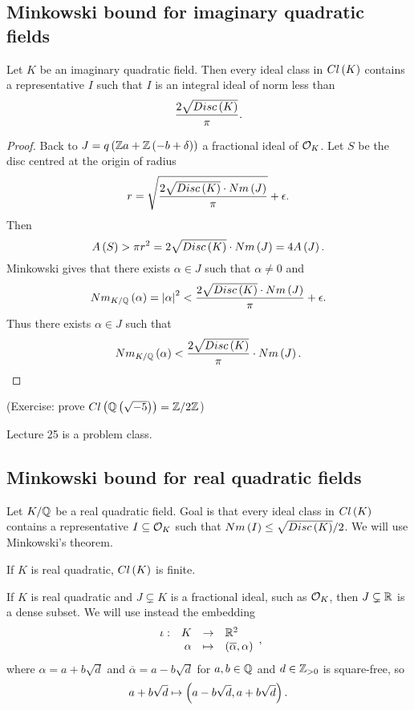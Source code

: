 \pagebreak

\subsection{Minkowski bound for imaginary quadratic fields}

\begin{theorem}
Let $ K $ be an imaginary quadratic field. Then every ideal class in $ Cl\left( K \right) $ contains a representative $ I $ such that $ I $ is an integral ideal of norm less than
$$ \dfrac{2\sqrt{Disc\left( K \right)}}{\pi}. $$
\end{theorem}

\begin{proof}
Back to $ J = q\left( \mathbb{Z} a + \mathbb{Z}\left( -b + \delta \right) \right) $ a fractional ideal of $ \mathcal{O}_K $. Let $ S $ be the disc centred at the origin of radius
$$ r = \sqrt{\dfrac{2\sqrt{Disc\left( K \right)} \cdot Nm\left( J \right)}{\pi}} + \epsilon. $$
Then
$$ A\left( S \right) > \pi r^2 = 2\sqrt{Disc\left( K \right)} \cdot Nm\left( J \right) = 4A\left( J \right). $$
Minkowski gives that there exists $ \alpha \in J $ such that $ \alpha \ne 0 $ and
$$ Nm_{K / \mathbb{Q}}\left( \alpha \right) = \left\lvert \alpha \right\rvert^2 < \dfrac{2\sqrt{Disc\left( K \right)} \cdot Nm\left( J \right)}{\pi} + \epsilon. $$
Thus there exists $ \alpha \in J $ such that
$$ Nm_{K / \mathbb{Q}}\left( \alpha \right) < \dfrac{2\sqrt{Disc\left( K \right)}}{\pi} \cdot Nm\left( J \right). $$
\end{proof}

(Exercise: prove $ Cl\left( \mathbb{Q}\left( \sqrt{-5} \right) \right) = \mathbb{Z} / 2\mathbb{Z} $)


Lecture 25 is a problem class.

\subsection{Minkowski bound for real quadratic fields}


Let $ K / \mathbb{Q} $ be a real quadratic field. Goal is that every ideal class in $ Cl\left( K \right) $ contains a representative $ I \subseteq \mathcal{O}_K $ such that $ Nm\left( I \right) \le \sqrt{Disc\left( K \right)} / 2 $. We will use Minkowski's theorem.

\begin{corollary}
If $ K $ is real quadratic, $ Cl\left( K \right) $ is finite.
\end{corollary}

If $ K $ is real quadratic and $ J \subsetneq K $ is a fractional ideal, such as $ \mathcal{O}_K $, then $ J \subsetneq \mathbb{R} $ is a dense subset. We will use instead the embedding
$$ \function[\iota]{K}{\R^2}{\alpha}{\rb{\overline{\alpha}, \alpha}}, $$
where $ \alpha = a + b\sqrt{d} $ and $ \overline{\alpha} = a - b\sqrt{d} $ for $ a, b \in \mathbb{Q} $ and $ d \in \mathbb{Z}_{> 0} $ is square-free, so
$$ a + b\sqrt{d} \mapsto \left( a - b\sqrt{d}, a + b\sqrt{d} \right). $$

